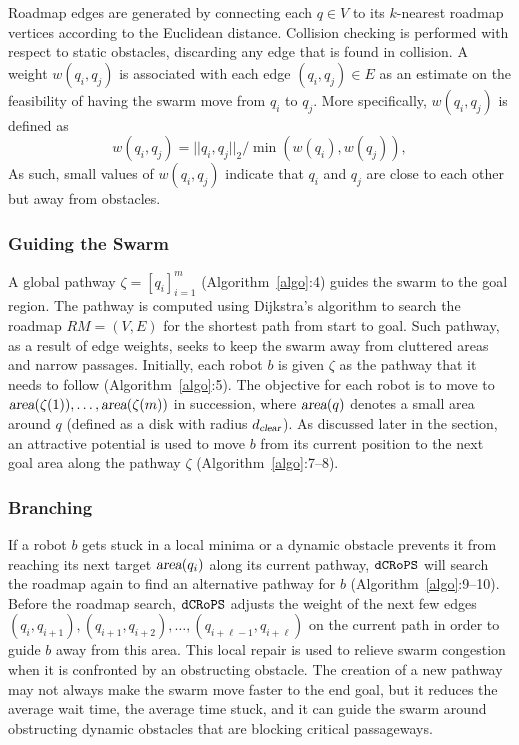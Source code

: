 \documentclass[letterpaper, 10pt, conference]{ieeeconf}
\newcommand{\Acronym}[1]{\ensuremath{{\small{\texttt{#1}}}}}
\newcommand{\Var}[1]{\ensuremath{{\small{\textsl{#1}}}}}
\newcommand{\Name}{\Acronym{dCRoPS}}
\begin{document}
Roadmap edges are generated by connecting each $q \in V$ to its
$k$-nearest roadmap vertices according to the Euclidean
distance. Collision checking is performed with respect to static
obstacles, discarding any edge that is found in collision. A weight
$w(q_i, q_j)$ is associated with each edge $(q_i, q_j) \in E$
as an estimate on the feasibility of having the swarm move from $q_i$
to $q_j$. More specifically, $w(q_i, q_j)$ is defined as 
$$
w(q_i, q_j) = ||q_i, q_j||_2 / \min(w(q_i), w(q_j)),
$$
As such, small values of $w(q_i, q_j)$ indicate that $q_i$ and $q_j$
are close to each other but away from obstacles.

\subsubsection{Guiding the Swarm}

A global pathway $\zeta = [q_i]_{i=1}^m$ (Algorithm~\ref{algo}:4)
guides the swarm to the goal region. The pathway is computed using
Dijkstra's algorithm to search the roadmap $RM=(V,E)$ for the shortest
path from start to goal. Such pathway, as a result of edge weights,
seeks to keep the swarm away from cluttered areas and narrow passages.
Initially, each robot $b$ is
given $\zeta$ as the pathway that it needs to follow
(Algorithm~\ref{algo}:5). The objective for each robot is to move to
$\Var{area}(\zeta(1)), \ldots, \Var{area}(\zeta(m))$ in succession,
where $\Var{area}(q)$ denotes a small area around $q$ (defined as a
disk with radius $d_\Var{clear}$). As discussed later in the section,
an attractive potential is used to move $b$ from its current position
to the next goal area along the pathway $\zeta$ (Algorithm~\ref{algo}:7--8).

\subsubsection{Branching} 

If a robot $b$ gets stuck in a local minima or a dynamic obstacle
prevents it from reaching its next target $\Var{area}(q_i)$ along its
current pathway, $\Name$ will search the roadmap again to find an
alternative pathway for $b$ (Algorithm~\ref{algo}:9--10).  Before the
roadmap search, $\Name$ adjusts the weight of the next few edges
$(q_i, q_{i+1}), (q_{i+1}, q_{i+2}), \ldots, (q_{i+\ell -1},
  q_{i+\ell})$ on the current path in order to guide $b$ away from
  this area.  This local repair is used to relieve swarm congestion
  when it is confronted by an obstructing obstacle. The creation of a
  new pathway may not always make the swarm move faster to the end
  goal, but it reduces the average wait time, the average time stuck,
  and it can guide the swarm around obstructing dynamic obstacles that
  are blocking critical passageways.
\end{document}
